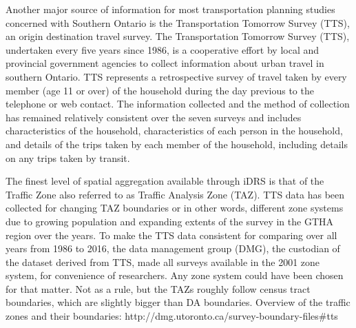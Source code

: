 Another major source of information for most transportation planning studies concerned with Southern Ontario is the Transportation Tomorrow Survey (TTS)\cite{DataManagementGroup2014}, an origin destination travel survey.
The Transportation Tomorrow Survey (TTS), undertaken every five years since 1986, is a cooperative effort by local and provincial government agencies to collect information about urban travel in southern Ontario.
TTS represents a retrospective survey of travel taken by every member (age 11 or over) of the household during the day previous to the telephone or web contact.
The information collected and the method of collection has remained relatively consistent over the seven surveys and includes characteristics of the household, characteristics of each person in the household, and details of the trips taken by each member of the household, including details on any trips taken by transit\cite{Ashby2018}.

The finest level of spatial aggregation available through iDRS is that of the Traffic Zone also referred to as Traffic Analysis Zone (TAZ).
TTS data has been collected for changing TAZ boundaries or in other words, different zone systems due to growing population and expanding extents of the survey in the GTHA region over the years.
To make the TTS data consistent for comparing over all years from 1986 to 2016, the data management group (DMG), the custodian of the dataset derived from TTS, made all surveys available in the 2001 zone system, for convenience of researchers.
Any zone system could have been chosen for that matter.
Not as a rule, but the TAZs roughly follow census tract boundaries, which are slightly bigger than DA boundaries.
Overview of the traffic zones and their boundaries: http://dmg.utoronto.ca/survey-boundary-files#tts


